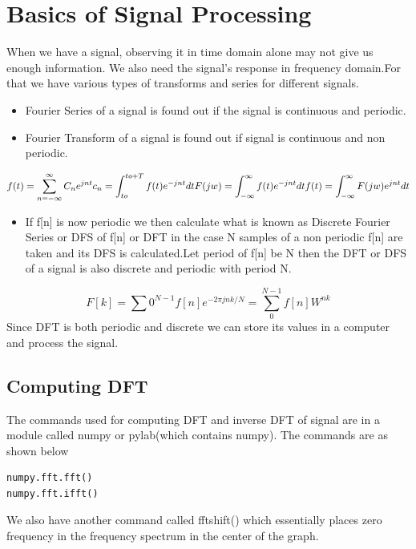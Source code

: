 \documentclass[10pt,english, openany]{book}
\begin{document}
\chapter{Basics of Signal Processing}
When we have a signal, observing it in time domain alone may not give us enough information. We also need the signal’s response in frequency domain.For that we have various types of transforms and series for different signals.\\
\begin{itemize}
\item Fourier Series of a signal is found out if the signal is continuous and
periodic.
\item Fourier Transform of a signal is found out if signal is continuous and
non periodic.
\end{itemize}
\begin{equation*}
f(t)=\sum_{n=-\infty}^{\infty} C_{n} e^{jnt}\\
c_{n}=\int_{to}^{to+T} f(t) e^{-jnt} dt\\
F(jw)=\int_{-\infty}^{\infty} f(t) e^{-jnt} dt\\
f(t)=\int_{-\infty}^{\infty} F(jw) e^{jnt} dt\\
\end{equation*}
\begin{itemize}
\item If f[n] is now periodic we then calculate what is known as Discrete Fourier Series or DFS of f[n] or DFT in the case N samples of a non periodic f[n] are taken and its DFS is calculated.Let period of f[n] be N then the DFT or DFS of a signal is also discrete and periodic with period N.
\end{itemize}
\begin{equation*}
F[k]=\sum{0}^{N-1} f[n] e^{-2\pi j nk/N}= 
\sum_{0}^{N-1} f[n] W^{ nk}
\end{equation*}
Since DFT is both periodic and discrete we can store its values in a computer
and process the signal.



\section{Computing DFT}
The commands used for computing DFT and inverse DFT of signal are in a module called numpy or pylab(which contains numpy). The commands are as shown below
\begin{verbatim}
numpy.fft.fft()
numpy.fft.ifft()
\end{verbatim}
We also have another command called fftshift() which essentially places zero frequency in the frequency spectrum in the center of the graph.
\end{document}

